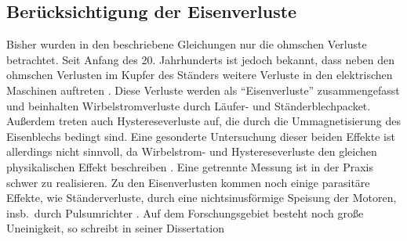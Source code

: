 \documentclass[conference,twocolumn]{IEEEtran}
\begin{document}




\subsection{Berücksichtigung der Eisenverluste}\label{sec:eisenverluste}

Bisher wurden in den beschriebene Gleichungen nur die ohmschen Verluste betrachtet.
Seit Anfang des 20. Jahrhunderts ist jedoch bekannt, dass neben den ohmschen Verlusten im Kupfer des Ständers weitere Verluste in den elektrischen Maschinen auftreten \autocites{reinert_calculation_2001}{stumberger_evaluation_2003}{kilthau_parameter-measurement_2001}{sturmberger}.
Diese Verluste werden als \enquote{Eisenverluste} zusammengefasst und beinhalten Wirbelstromverluste durch Läufer- und Ständerblechpacket.
Außerdem treten auch Hystereseverluste auf, die durch die Ummagnetisierung des Eisenblechs bedingt sind.
Eine gesonderte Untersuchung dieser beiden Effekte ist allerdings nicht sinnvoll, da Wirbelstrom- und Hystereseverluste den gleichen physikalischen Effekt beschreiben \autocite{reinert_calculation_2001}.
Eine getrennte Messung ist in der Praxis schwer zu realisieren.
Zu den Eisenverlusten kommen noch einige parasitäre Effekte, wie Ständerverluste, durch eine nichtsinusförmige Speisung der Motoren, insb.\ durch Pulsumrichter \autocite{Kellner2012}.
Auf dem Forschungsgebiet besteht noch große Uneinigkeit, so schreibt \textcite{Kellner2012} in seiner Dissertation
\end{document}
